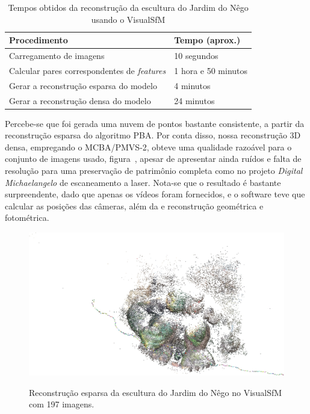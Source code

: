 \begin{table}[h!]
\caption{Tempos obtidos da reconstrução da escultura do Jardim do Nêgo usando o VisualSfM}
\label{tab:temposSfMJardimDoNego}
\begin{tabular}{|l|p{4.7cm}|}
\hline
Procedimento & Tempo (aprox.) \\ \hline
Carregamento de imagens & 10 segundos \\ \hline
Calcular pares correspondentes de \emph{features} & 1 hora e 50 minutos \\ \hline
Gerar a reconstrução esparsa do modelo & 4 minutos \\ \hline
Gerar a reconstrução densa do modelo & 24 minutos \\ \hline
\end{tabular}
\end{table}

Percebe-se que foi gerada uma nuvem de pontos bastante consistente, a partir da
reconstrução esparsa do algoritmo PBA.  Por conta disso, nossa reconstrução 3D
densa, empregando o MCBA/PMVS-2, obteve uma qualidade razoável para o conjunto de
imagens usado, figura~\cite{fig:reconstrucaoEsparsaIndioVisualSFM}, apesar de apresentar ainda ruídos e falta de resolução para uma
preservação de patrimônio completa como no projeto \emph{Digital Michaelangelo}
de escaneamento a laser. Nota-se que o resultado é bastante surpreendente, dado que
apenas os vídeos foram fornecidos, e o software teve que calcular as posições
das câmeras, além da e reconstrução geométrica e fotométrica.

\newpage

\begin{figure}[!h]
	\centering
	\caption{%
	Reconstrução esparsa da escultura do Jardim do Nêgo no VisualSfM com 197 imagens.
	}
	\includegraphics[width=0.9\linewidth]{figs/guerreiroEsparsa.jpg}
		\label{fig:reconstrucaoEsparsaIndioVisualSFM}
\end{figure}

